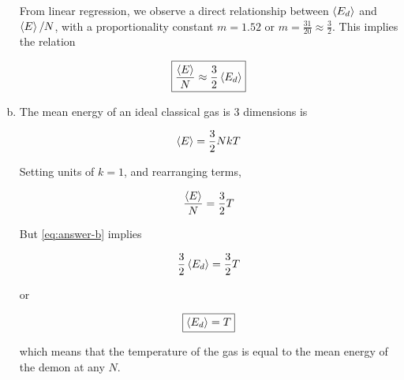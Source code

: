 \documentclass[12pt,a4paper,twocolumn]{article}
\begin{document}
\begin{enumerate}[(a)]
From linear regression, we observe a direct relationship between $\ev{E_d}$ and $\ev{E}/N$, with a proportionality constant $m = 1.52$ or $m = \frac{31}{20} \approx \frac{3}{2}$. This implies the relation

\begin{equation}
	\boxed{
		\frac{\ev{E}}{N} \approx \frac{3}{2} \ev{E_d}
	} \label{eq:answer-b}
\end{equation}

\item The mean energy of an ideal classical gas is 3 dimensions is

\begin{equation}
	\ev{E} = \frac{3}{2}NkT \label{eq:energy-ideal}
\end{equation}

Setting units of $k = 1$, and rearranging terms,

\begin{equation}
	\frac{\ev{E}}{N} = \frac{3}{2}T \label{eq:energy-unity}
\end{equation}

But \eqref{eq:answer-b} implies

\begin{equation}
	\frac{3}{2}\ev{E_d} = \frac{3}{2}T
\end{equation}

or

\begin{equation}
	\boxed{
		\ev{E_d} = T
	} \label{eq:answer-c}
\end{equation}

which means that the temperature of the gas is equal to the mean energy of the demon at any $N$.


\end{enumerate}
\end{document}
